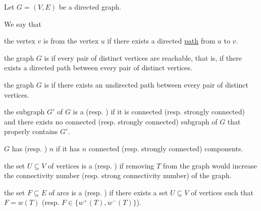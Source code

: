 \begin{definition}\label{def:graph_connectivity}
  Let \( G = (V, E) \) be a directed graph.

  We say that
  \begin{defenum}
     the vertex \( v \) is  from the vertex \( u \) if there exists a directed \hyperref[def:graph_paths/directed_path]{path} from \( u \) to \( v \).

    \cite[chapter 1, section 3.5]{Gondran1984} the graph \( G \) is  if every pair of distinct vertices are reachable, that is, if there exists a directed path between every pair of distinct vertices.

    \cite[chapter 1, section 3.3]{Gondran1984} the graph \( G \) is  if there exists an undirected path between every pair of distinct vertices.

    \cite[chapter 1, sections 3.3 and 3.5]{Gondran1984} the subgraph \( G' \) of \( G \) is a  (resp. ) if it is connected (resp. strongly connected) and there exists no connected (resp. strongly connected) subgraph of \( G \) that properly contains \( G' \).

    \cite[chapter 1, sections 3.3 and 3.5]{Gondran1984} \( G \) has  (resp. ) $n$ if it has $n$ connected (resp. strongly connected) components.

    \cite[chapter 1, section 3.4]{Gondran1984} the set \( U \subseteq V \) of vertices is a  (resp. ) if removing \( T \) from the graph would increase the connectivity number (resp. strong connectivity number) of the graph.

    \cite[chapter 1, section 4.4]{Gondran1984} the set \( F \subseteq E \) of arcs is a  (resp. ) if there exists a set \( U \subseteq V \) of vertices such that \( F = w(T) \) (resp. \( F \in \{ w^+(T), w^-(T) \} \)).
  \end{defenum}
\end{definition}


